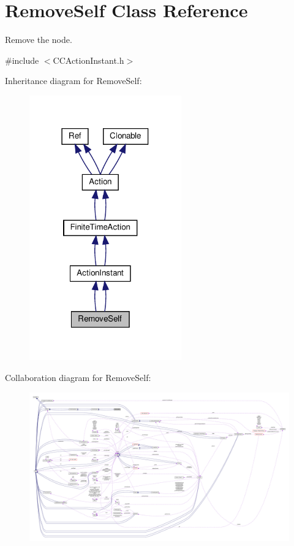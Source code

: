 \hypertarget{classRemoveSelf}{}\section{Remove\+Self Class Reference}
\label{classRemoveSelf}


Remove the node.  




{\ttfamily \#include $<$C\+C\+Action\+Instant.\+h$>$}



Inheritance diagram for Remove\+Self\+:
\nopagebreak
\begin{figure}[H]
\begin{center}
\leavevmode
\includegraphics[width=186pt]{classRemoveSelf__inherit__graph}
\end{center}
\end{figure}


Collaboration diagram for Remove\+Self\+:
\nopagebreak
\begin{figure}[H]
\begin{center}
\leavevmode
\includegraphics[width=350pt]{classRemoveSelf__coll__graph}
\end{center}
\end{figure}
